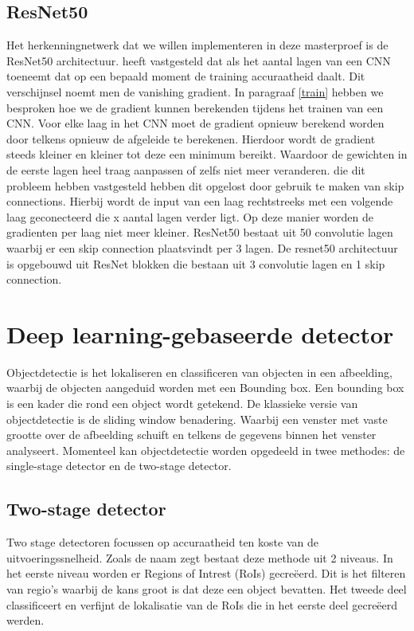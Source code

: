\subsection{ResNet50}
Het herkenningnetwerk dat we willen implementeren in deze masterproef is de ResNet50 architectuur.
\cite{he2015deep} heeft vastgesteld dat als het aantal lagen van een CNN toeneemt dat op een bepaald moment de training accuraatheid daalt.
Dit verschijnsel noemt men de vanishing gradient.
In paragraaf \ref{train} hebben we besproken hoe we de gradient kunnen berekenden tijdens het trainen van een CNN.
Voor elke laag in het CNN moet de gradient opnieuw berekend worden door telkens opnieuw de afgeleide te berekenen.
Hierdoor wordt de gradient steeds kleiner en kleiner tot deze een minimum bereikt.
Waardoor de gewichten in de eerste lagen heel traag aanpassen of zelfs niet meer veranderen.
\cite{he2015deep} die dit probleem hebben vastgesteld hebben dit opgelost door gebruik te maken van skip connections.
Hierbij wordt de input van een laag rechtstreeks met een volgende laag geconecteerd die x aantal lagen verder ligt.
Op deze manier worden de gradienten per laag niet meer kleiner.
ResNet50 bestaat uit 50 convolutie lagen waarbij er een skip connection plaatsvindt per 3 lagen.
De resnet50 architectuur is opgebouwd uit ResNet blokken die bestaan uit 3 convolutie lagen en 1 skip connection.

\section{Deep learning-gebaseerde detector}
Objectdetectie is het lokaliseren en classificeren van objecten in een afbeelding, waarbij de objecten aangeduid worden met een Bounding box.
Een bounding box is een kader die rond een object wordt getekend. 
De klassieke versie van objectdetectie is de sliding window benadering.
Waarbij een venster met vaste grootte over de afbeelding schuift en telkens de gegevens binnen het venster analyseert.
Momenteel kan objectdetectie worden opgedeeld in twee methodes: de single-stage detector en de two-stage detector.

\subsection{Two-stage detector}
Two stage detectoren focussen op accuraatheid ten koste van de uitvoeringssnelheid.
Zoals de naam zegt bestaat deze methode uit 2 niveaus. 
In het eerste niveau worden er Regions of Intrest (RoIs) gecre\"eerd.
Dit is het filteren van regio's waarbij de kans groot is dat deze een object bevatten. 
Het tweede deel classificeert en verfijnt de lokalisatie van de RoIs die in het eerste deel gecre\"eerd werden. 

